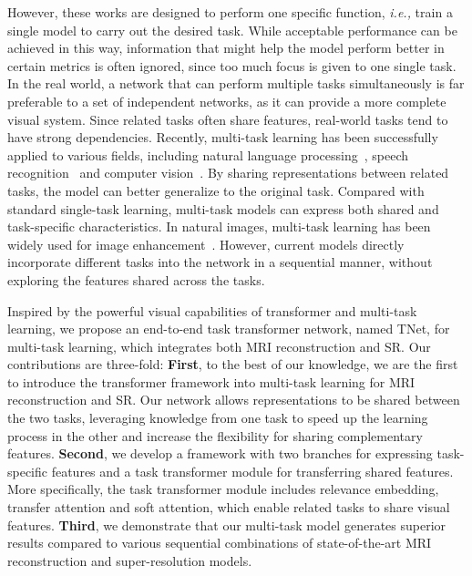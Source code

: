 \documentclass[runningheads]{llncs}
\newcommand{\ie}[1]{\textit{i.e.,}}
\begin{document}
However, these works are designed to perform one specific function, \ie, train a single model to carry out the desired task. While acceptable performance can be achieved in this way, information that might help the model perform better in certain metrics is often ignored, since too much focus is given to one single task. In the real world, a network that can perform multiple tasks simultaneously is far preferable to a set of independent networks, as it can provide a more complete visual system. Since related tasks often share features, real-world tasks tend to have strong dependencies. Recently, multi-task learning has been successfully applied to various fields, including natural language processing~\cite{collobert2008unified}, speech recognition~\cite{kim2017joint} and computer vision~\cite{liu2019end}. By sharing representations between related tasks, the model can better generalize to the original task. Compared with standard single-task learning, multi-task models can express both shared and task-specific characteristics. In natural images, multi-task learning has been widely used for image enhancement~\cite{cai2019fcsr,zhang2018joint}. However, current models directly incorporate different tasks into the network in a sequential manner, without exploring the features shared across the tasks.
















Inspired by the powerful visual capabilities of transformer and multi-task learning, we propose an end-to-end task transformer network, named TNet, for multi-task learning, which integrates both MRI reconstruction and SR. Our contributions are three-fold: \textbf{First}, to the best of our knowledge, we are the first to introduce the transformer framework into multi-task learning for MRI reconstruction and SR. Our network allows representations to be shared between the two tasks, leveraging knowledge from one task to speed up the learning process in the other and increase the flexibility for sharing complementary features. \textbf{Second}, we develop a framework with two branches for expressing task-specific features and a task transformer module for transferring shared features. More specifically, the task transformer module includes relevance embedding, transfer attention and soft attention, which enable related tasks to share visual features. \textbf{Third}, we demonstrate that our multi-task model generates superior results compared to various sequential combinations of state-of-the-art MRI reconstruction and super-resolution models. 
\end{document}
